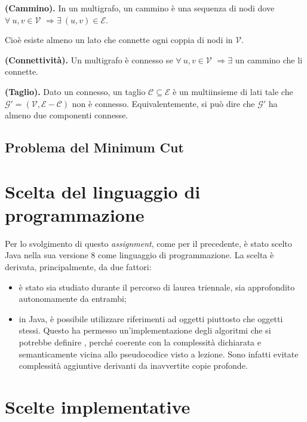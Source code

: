 \begin{defi} \textbf{(Cammino).} In un multigrafo, un cammino è una sequenza di nodi dove $\forall\ u,v\in\mathcal{V}$ $\Rightarrow\exists\ (u,v)\in\mathcal{E} $.
\end{defi}
Cioè esiste almeno un lato che connette ogni coppia di nodi in $\mathcal{V}$.
\begin{defi} \textbf{(Connettività).} Un multigrafo è connesso se $\forall\ u,v\in\mathcal{V}$ $\Rightarrow\exists$ un cammino che li connette.
\end{defi}
\begin{defi} \textbf{(Taglio).} Dato un \mgrafo connesso, un taglio $\mathcal{C}\subseteq\mathcal{E}$ è un multiinsieme di lati tale che $\mathcal{G}' = (\mathcal{V}, \mathcal{E} - \mathcal{C})$ non è connesso.\eqcapo
Equivalentemente, si può dire che $\mathcal{G}'$ ha almeno due componenti connesse.
\end{defi}
\newpage
\subsection{Problema del Minimum Cut}
\emph{}
 
\section{Scelta del linguaggio di programmazione}
Per lo svolgimento di questo \emph{assignment}, come per il precedente, è stato scelto Java nella sua versione 8 come linguaggio di programmazione. La scelta è derivata, principalmente, da due fattori: 
\begin{itemize}
	\item è stato sia studiato durante il percorso di laurea triennale, sia approfondito autonomamente da entrambi;
	\item in Java, è possibile utilizzare riferimenti ad oggetti piuttosto che oggetti stessi. Questo ha permesso un'implementazione degli algoritmi che si potrebbe definire , perché coerente con la complessità dichiarata e semanticamente vicina allo pseudocodice visto a lezione. Sono infatti evitate complessità aggiuntive derivanti da inavvertite copie profonde.
\end{itemize}

\section{Scelte implementative}

